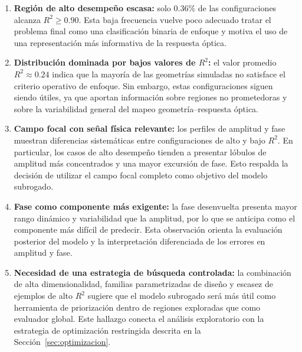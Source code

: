 \begin{enumerate}
\item \textbf{Región de alto desempeño escasa:} solo $0.36\%$ de las configuraciones alcanza $R^2 \geq 0.90$. Esta baja frecuencia vuelve poco adecuado tratar el problema final como una clasificación binaria de enfoque y motiva el uso de una representación más informativa de la respuesta óptica.

\item \textbf{Distribución dominada por bajos valores de $R^2$:} el valor promedio $R^2 \approx 0.24$ indica que la mayoría de las geometrías simuladas no satisface el criterio operativo de enfoque. Sin embargo, estas configuraciones siguen siendo útiles, ya que aportan información sobre regiones no prometedoras y sobre la variabilidad general del mapeo geometría--respuesta óptica.

\item \textbf{Campo focal con señal física relevante:} los perfiles de amplitud y fase muestran diferencias sistemáticas entre configuraciones de alto y bajo $R^2$. En particular, los casos de alto desempeño tienden a presentar lóbulos de amplitud más concentrados y una mayor excursión de fase. Esto respalda la decisión de utilizar el campo focal completo como objetivo del modelo subrogado.

\item \textbf{Fase como componente más exigente:} la fase desenvuelta presenta mayor rango dinámico y variabilidad que la amplitud, por lo que se anticipa como el componente más difícil de predecir. Esta observación orienta la evaluación posterior del modelo y la interpretación diferenciada de los errores en amplitud y fase.

\item \textbf{Necesidad de una estrategia de búsqueda controlada:} la combinación de alta dimensionalidad, familias parametrizadas de diseño y escasez de ejemplos de alto $R^2$ sugiere que el modelo subrogado será más útil como herramienta de priorización dentro de regiones exploradas que como evaluador global. Este hallazgo conecta el análisis exploratorio con la estrategia de optimización restringida descrita en la Sección~\ref{sec:optimizacion}.

\end{enumerate}

